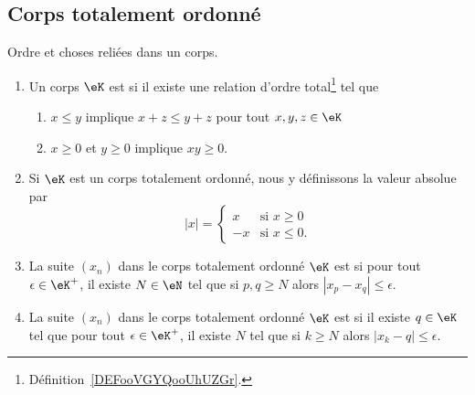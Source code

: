 \subsection{Corps totalement ordonné}

\begin{definition}      \label{DefKCGBooLRNdJf}
	Ordre et choses reliées dans un corps.
	\begin{enumerate}
		\item \label{ITEMooOOOVooJWwIQr}
		      Un corps \( \eK\) est  si il existe une relation d'ordre total\footnote{Définition~\ref{DEFooVGYQooUhUZGr}.} tel que
		      \begin{enumerate}
			      \item       \label{ITEMooZISJooWNxnBj}
			            \( x\leq y\) implique \( x+z\leq y+z\) pour tout \( x,y,z\in \eK\)
			      \item   \label{CONDooBYYDooElXgPO}
			            \( x\geq 0\) et \( y\geq 0\) implique \( xy\geq 0\).
		      \end{enumerate}
		\item       \label{ItemooWUGSooRSRvYC}
		      Si \( \eK\) est un corps totalement ordonné, nous y définissons la valeur absolue par
		      \begin{equation}
			      | x |=\begin{cases}
				      x  & \text{si }x\geq 0   \\
				      -x & \text{si } x\leq 0.
			      \end{cases}
		      \end{equation}
		\item       \label{ItemVXOZooTYpcYN}
		      La suite \( (x_n)\) dans le corps totalement ordonné \( \eK\) est  si pour tout \( \epsilon\in \eK^+\), il existe \( N\in \eN\) tel que si \( p,q\geq N\) alors \( | x_p-x_q |\leq \epsilon\).
		\item       \label{ITEMooDERQooLmJwFR}
		      La suite \( (x_n)\) dans le corps totalement ordonné \( \eK\) est  si il existe \( q\in \eK\) tel que pour tout \( \epsilon\in \eK^+\), il existe \( N\) tel que si \( k\geq N\) alors \( | x_k-q |\leq \epsilon\).


\end{enumerate}
\end{definition}
